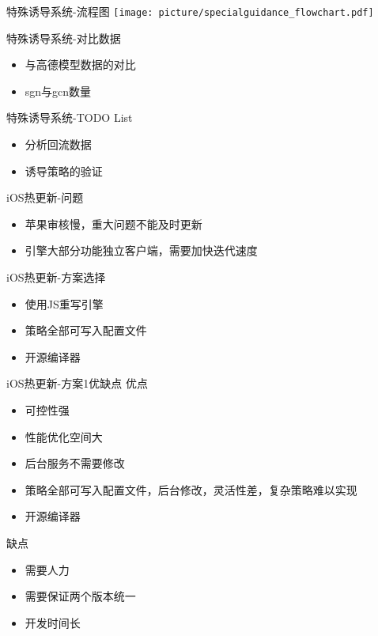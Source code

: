 \documentclass[10pt]{beamer}
\begin{document}
\begin{frame}{特殊诱导系统-流程图}
\texttt{[image: picture/specialguidance\_flowchart.pdf]}
\end{frame}

\begin{frame}{特殊诱导系统-对比数据}
  \begin{itemize}
    \item 与高德模型数据的对比
    \item sgn与gcn数量
  \end{itemize}
\end{frame}

\begin{frame}{特殊诱导系统-TODO List}
  \begin{itemize}
    \item 分析回流数据
    \item 诱导策略的验证
  \end{itemize}
\end{frame}

\begin{frame}{iOS热更新-问题}
  \begin{itemize}
    \item 苹果审核慢，重大问题不能及时更新
    \item 引擎大部分功能独立客户端，需要加快迭代速度
  \end{itemize}
\end{frame}

\begin{frame}{iOS热更新-方案选择}
  \begin{itemize}
    \item 使用JS重写引擎
    \item 策略全部可写入配置文件
	\item 开源编译器
	\end{itemize}
\end{frame}

\begin{frame}{iOS热更新-方案1优缺点}
  优点
  \begin{itemize}
    \item 可控性强
    \item 性能优化空间大
    \item 后台服务不需要修改
    \item 策略全部可写入配置文件，后台修改，灵活性差，复杂策略难以实现
	\item 开源编译器
	\end{itemize}
  缺点
  \begin{itemize}
    \item 需要人力
    \item 需要保证两个版本统一
    \item 开发时间长
  \end{itemize}
\end{frame}
\end{document}
